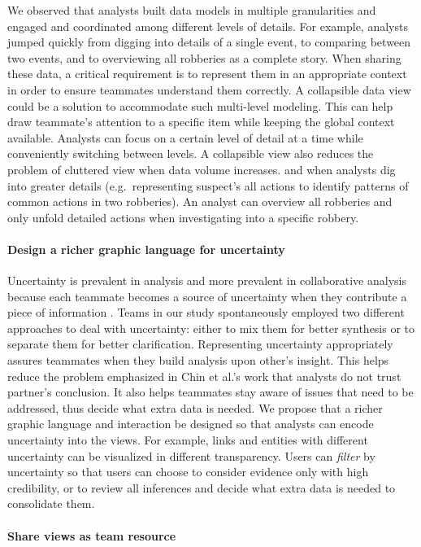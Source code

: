 We observed that analysts built data models in multiple granularities and engaged and coordinated among different levels of details. For example, analysts jumped
quickly from digging into details of a single event, to comparing between two
events, and to overviewing all robberies as a complete story. When sharing these data, a critical requirement is to represent them in an appropriate context in order to ensure teammates understand them correctly. A collapsible data view could be a solution to accommodate such
multi-level modeling. This can help draw teammate's attention to a specific item
while keeping the global context available. Analysts can focus on a certain
level of detail at a time while conveniently switching between levels. A
collapsible view also reduces the problem of cluttered view when data volume
increases.  and when analysts dig into greater
details (e.g.~representing suspect's all actions to identify patterns of common
actions in two robberies). An analyst can overview all robberies and only unfold
detailed actions when investigating into a specific robbery.

\paragraph{Design a richer graphic language for uncertainty}

Uncertainty is prevalent in analysis and more prevalent in collaborative
analysis because each teammate becomes a source of uncertainty when they
contribute a piece of information \cite{Chin2009}. Teams in our study
spontaneously employed two different approaches to deal with uncertainty: either
to mix them for better synthesis or to separate them for better clarification.
Representing uncertainty appropriately assures teammates when they build
analysis upon other's insight. This helps reduce the problem emphasized in Chin
et al.'s work \cite{Chin2009} that analysts do not trust partner's conclusion.
It also helps teammates stay aware of issues that need to be addressed, thus
decide what extra data is needed. We propose that a richer graphic language and
interaction be designed so that analysts can encode uncertainty into the views.
For example, links and entities with different uncertainty can be visualized in
different transparency. Users can \emph{filter} by uncertainty so that users can
choose to consider evidence only with high credibility, or to review all
inferences and decide what extra data is needed to consolidate them.

\paragraph{Share views as team resource}

